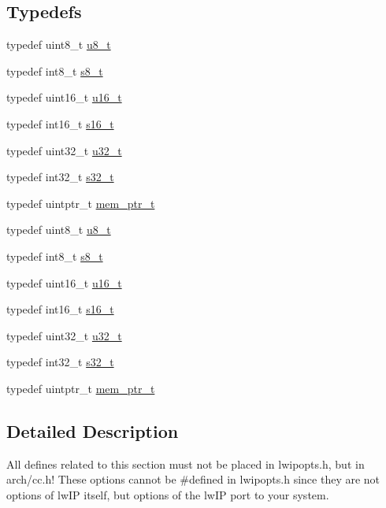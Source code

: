 \subsection*{Typedefs}
\begin{DoxyCompactItemize}
\item 
typedef uint8\+\_\+t \hyperlink{group__compiler__abstraction_ga4caecabca98b43919dd11be1c0d4cd8e}{u8\+\_\+t}
\item 
typedef int8\+\_\+t \hyperlink{group__compiler__abstraction_ga9cd1d7891fe315de1201e2c6e45f4f57}{s8\+\_\+t}
\item 
typedef uint16\+\_\+t \hyperlink{group__compiler__abstraction_ga77570ac4fcab86864fa1916e55676da2}{u16\+\_\+t}
\item 
typedef int16\+\_\+t \hyperlink{group__compiler__abstraction_gacf46f4df0ebab84edebcb69967fdf86b}{s16\+\_\+t}
\item 
typedef uint32\+\_\+t \hyperlink{group__compiler__abstraction_ga4c14294869aceba3ef9d4c0c302d0f33}{u32\+\_\+t}
\item 
typedef int32\+\_\+t \hyperlink{group__compiler__abstraction_ga10f9a3d7baef58ccc23228c3bd29c1fb}{s32\+\_\+t}
\item 
typedef uintptr\+\_\+t \hyperlink{group__compiler__abstraction_gaf019cbb71af10dcfda7758b21e655307}{mem\+\_\+ptr\+\_\+t}
\item 
typedef uint8\+\_\+t \hyperlink{group__compiler__abstraction_ga4caecabca98b43919dd11be1c0d4cd8e}{u8\+\_\+t}
\item 
typedef int8\+\_\+t \hyperlink{group__compiler__abstraction_ga9cd1d7891fe315de1201e2c6e45f4f57}{s8\+\_\+t}
\item 
typedef uint16\+\_\+t \hyperlink{group__compiler__abstraction_ga77570ac4fcab86864fa1916e55676da2}{u16\+\_\+t}
\item 
typedef int16\+\_\+t \hyperlink{group__compiler__abstraction_gacf46f4df0ebab84edebcb69967fdf86b}{s16\+\_\+t}
\item 
typedef uint32\+\_\+t \hyperlink{group__compiler__abstraction_ga4c14294869aceba3ef9d4c0c302d0f33}{u32\+\_\+t}
\item 
typedef int32\+\_\+t \hyperlink{group__compiler__abstraction_ga10f9a3d7baef58ccc23228c3bd29c1fb}{s32\+\_\+t}
\item 
typedef uintptr\+\_\+t \hyperlink{group__compiler__abstraction_gaf019cbb71af10dcfda7758b21e655307}{mem\+\_\+ptr\+\_\+t}
\end{DoxyCompactItemize}


\subsection{Detailed Description}
All defines related to this section must not be placed in lwipopts.\+h, but in arch/cc.\+h! These options cannot be \#defined in lwipopts.\+h since they are not options of lw\+IP itself, but options of the lw\+IP port to your system. 

